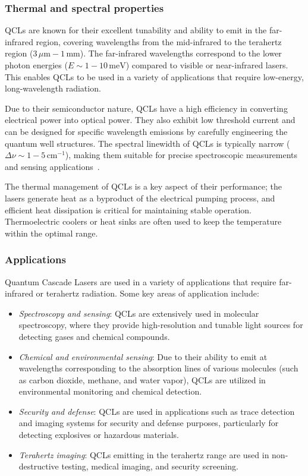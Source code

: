 \documentclass[prl,twocolumn]{revtex4-1}
\begin{document}
\subsubsection{\textbf{Thermal and spectral properties}}
QCLs are known for their excellent tunability and ability to emit in the far-infrared region, covering wavelengths from the mid-infrared to the terahertz region (\( 3 \, \mu\text{m} - 1 \, \text{mm} \)). The far-infrared wavelengths correspond to the lower photon energies (\( E \sim 1 - 10 \, \text{meV} \)) compared to visible or near-infrared lasers. This enables QCLs to be used in a variety of applications that require low-energy, long-wavelength radiation.

Due to their semiconductor nature, QCLs have a high efficiency in converting electrical power into optical power. They also exhibit low threshold current and can be designed for specific wavelength emissions by carefully engineering the quantum well structures. The spectral linewidth of QCLs is typically narrow (\( \Delta \nu \sim 1 - 5 \, \text{cm}^{-1} \)), making them suitable for precise spectroscopic measurements and sensing applications~\cite{qcl_lasers}.

The thermal management of QCLs is a key aspect of their performance; the lasers generate heat as a byproduct of the electrical pumping process, and efficient heat dissipation is critical for maintaining stable operation. Thermoelectric coolers or heat sinks are often used to keep the temperature within the optimal range.

\subsubsection{\textbf{Applications}}
Quantum Cascade Lasers are used in a variety of applications that require far-infrared or terahertz radiation. Some key areas of application include:
\begin{itemize}
  \item \textit{Spectroscopy and sensing}: QCLs are extensively used in molecular spectroscopy, where they provide high-resolution and tunable light sources for detecting gases and chemical compounds.
  \item \textit{Chemical and environmental sensing}: Due to their ability to emit at wavelengths corresponding to the absorption lines of various molecules (such as carbon dioxide, methane, and water vapor), QCLs are utilized in environmental monitoring and chemical detection.
  \item \textit{Security and defense}: QCLs are used in applications such as trace detection and imaging systems for security and defense purposes, particularly for detecting explosives or hazardous materials.
  \item \textit{Terahertz imaging}: QCLs emitting in the terahertz range are used in non-destructive testing, medical imaging, and security screening.
\end{itemize}
\end{document}
